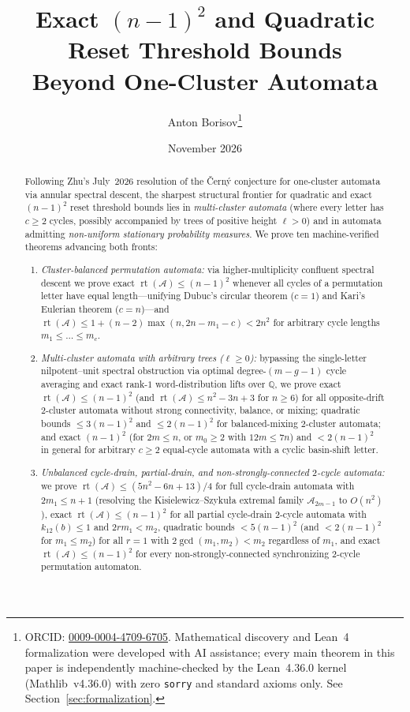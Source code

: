 \documentclass[11pt,a4paper]{article}
\title{Exact $(n-1)^2$ and Quadratic Reset Threshold Bounds\\Beyond One-Cluster Automata}
\author{Anton Borisov\thanks{ORCID: \href{https://orcid.org/0009-0004-4709-6705}{0009-0004-4709-6705}. Mathematical discovery and Lean~4 formalization were developed with AI assistance; every main theorem in this paper is independently machine-checked by the Lean~4.36.0 kernel (Mathlib~v4.36.0) with zero \texttt{sorry} and standard axioms only. See Section~\ref{sec:formalization}.}}
\date{November 2026}
\theoremstyle{definition}
\theoremstyle{remark}
\newcommand{\rt}{\operatorname{rt}}
\newcommand{\Q}{\mathbb{Q}}
\newcommand{\cA}{\mathcal{A}}
\begin{document}
\maketitle

\begin{abstract}
Following Zhu's July~2026 resolution of the \v{C}ern\'y conjecture for one-cluster automata via annular spectral descent, the sharpest structural frontier for quadratic and exact $(n-1)^2$ reset threshold bounds lies in \emph{multi-cluster automata} (where every letter has $c \ge 2$ cycles, possibly accompanied by trees of positive height $\ell > 0$) and in automata admitting \emph{non-uniform stationary probability measures}. We prove ten machine-verified theorems advancing both fronts:
\begin{enumerate}[label=(\roman*),nosep]
  \item \emph{Cluster-balanced permutation automata:} via higher-multiplicity confluent spectral descent we prove exact $\rt(\cA) \le (n-1)^2$ whenever all cycles of a permutation letter have equal length---unifying Dubuc's circular theorem ($c=1$) and Kari's Eulerian theorem ($c=n$)---and $\rt(\cA) \le 1 + (n-2)\max(n, 2n - m_1 - c) < 2n^2$ for arbitrary cycle lengths $m_1 \le \dots \le m_c$.
  \item \emph{Multi-cluster automata with arbitrary trees ($\ell \ge 0$):} bypassing the single-letter nilpotent--unit spectral obstruction via optimal degree-$(m-g-1)$ cycle averaging and exact rank-$1$ word-distribution lifts over $\Q$, we prove exact $\rt(\cA) \le (n-1)^2$ (and $\rt(\cA) \le n^2-3n+3$ for $n \ge 6$) for all opposite-drift $2$-cluster automata without strong connectivity, balance, or mixing; quadratic bounds $\le 3(n-1)^2$ and $\le 2(n-1)^2$ for balanced-mixing $2$-cluster automata; and exact $(n-1)^2$ (for $2m \le n$, or $m_0 \ge 2$ with $12m \le 7n$) and $< 2(n-1)^2$ in general for arbitrary $c \ge 2$ equal-cycle automata with a cyclic basin-shift letter.
  \item \emph{Unbalanced cycle-drain, partial-drain, and non-strongly-connected $2$-cycle automata:} we prove $\rt(\cA) \le (5n^2 - 6n + 13)/4$ for full cycle-drain automata with $2m_1 \le n+1$ (resolving the Kisielewicz--Szyku\l a extremal family $\cA_{2m-1}$ to $O(n^2)$), exact $\rt(\cA) \le (n-1)^2$ for all partial cycle-drain $2$-cycle automata with $k_{12}(b) \le 1$ and $2r m_1 < m_2$, quadratic bounds $< 5(n-1)^2$ (and $< 2(n-1)^2$ for $m_1 \le m_2$) for all $r = 1$ with $2\gcd(m_1, m_2) < m_2$ regardless of $m_1$, and exact $\rt(\cA) \le (n-1)^2$ for every non-strongly-connected synchronizing $2$-cycle permutation automaton.

\end{enumerate}
\end{abstract}
\end{document}
